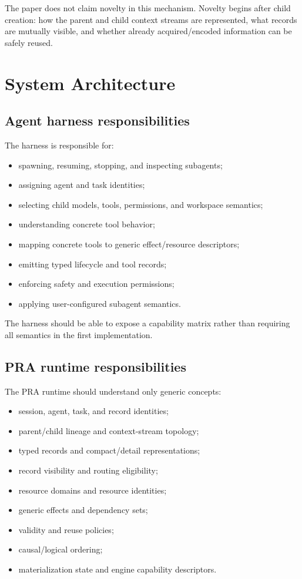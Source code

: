 \documentclass[11pt]{article}
\begin{document}
The paper does not claim novelty in this mechanism. Novelty begins after child creation: how the parent and child context streams are represented, what records are mutually visible, and whether already acquired/encoded information can be safely reused.

\section{System Architecture}

\subsection{Agent harness responsibilities}

The harness is responsible for:

\begin{itemize}[leftmargin=*]
    \item spawning, resuming, stopping, and inspecting subagents;
    \item assigning agent and task identities;
    \item selecting child models, tools, permissions, and workspace semantics;
    \item understanding concrete tool behavior;
    \item mapping concrete tools to generic effect/resource descriptors;
    \item emitting typed lifecycle and tool records;
    \item enforcing safety and execution permissions;
    \item applying user-configured subagent semantics.
\end{itemize}

The harness should be able to expose a capability matrix rather than requiring all semantics in the first implementation.

\subsection{PRA runtime responsibilities}

The PRA runtime should understand only generic concepts:

\begin{itemize}[leftmargin=*]
    \item session, agent, task, and record identities;
    \item parent/child lineage and context-stream topology;
    \item typed records and compact/detail representations;
    \item record visibility and routing eligibility;
    \item resource domains and resource identities;
    \item generic effects and dependency sets;
    \item validity and reuse policies;
    \item causal/logical ordering;
    \item materialization state and engine capability descriptors.
\end{itemize}
\end{document}
